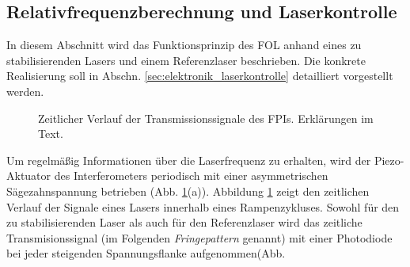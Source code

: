 \subsection{Relativfrequenzberechnung
und Laserkontrolle}\label{subsec:relativfrequenzberechnung_und_laserkontrolle}
In diesem Abschnitt wird das Funktionsprinzip des FOL anhand
eines zu stabilisierenden Lasers und einem Referenzlaser beschrieben. Die
konkrete Realisierung soll in Abschn. \ref{sec:elektronik_laserkontrolle}
detailliert vorgestellt werden.\par
\begin{figure}[h]
 	\centering
	\caption[Zeitlicher Verlauf
	FPI-Transmission]{Zeitlicher Verlauf der
	Transmissionssignale des FPIs. Erklärungen im Text.}\label{fig:FPI_signal-zeitverlauf}
\end{figure}
Um regelmäßig Informationen über die Laserfrequenz zu erhalten, wird der
Piezo-Aktuator des Interferometers periodisch mit einer asymmetrischen
Sägezahnspannung betrieben (Abb. \ref{fig:FPI_signal-zeitverlauf}(a)). Abbildung
\ref{fig:FPI_signal-zeitverlauf} zeigt den zeitlichen Verlauf der Signale eines
Lasers innerhalb eines Rampenzykluses. Sowohl für den zu stabilisierenden
Laser als auch für den Referenzlaser wird das zeitliche Transmisionssignal (im
Folgenden \textit{Fringepattern} genannt) mit einer Photodiode bei jeder
steigenden Spannungsflanke aufgenommen(Abb.
